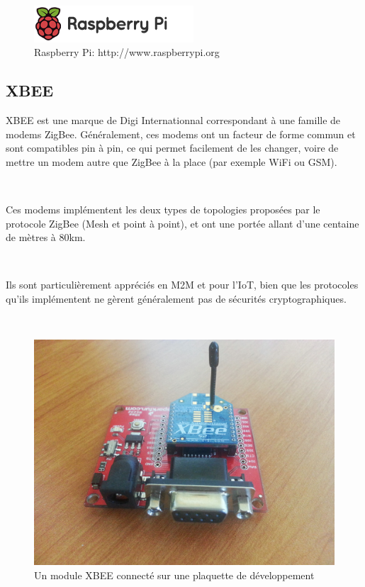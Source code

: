 \documentclass{article}
\begin{document}
~

\begin{figure}[h!]
    \centering\includegraphics[width=\linewidth*2/3]{img/sprite.png}
    \caption{Raspberry Pi: http://www.raspberrypi.org}
\end{figure}

\clearpage

\subsection{XBEE}
\label{xbee}

XBEE est une marque de Digi Internationnal correspondant à une famille de modems ZigBee. Généralement, ces modems ont un facteur de forme commun et sont compatibles pin à pin, ce qui permet facilement de les changer, voire de mettre un modem autre que ZigBee à la place (par exemple WiFi ou GSM).

~

Ces modems implémentent les deux types de topologies proposées par le protocole ZigBee (Mesh et point à point), et ont une portée allant d’une centaine de mètres à 80km.

~

Ils sont particulièrement appréciés en M2M et pour l’IoT, bien que les protocoles qu’ils implémentent ne gèrent généralement pas de sécurités cryptographiques.

~

\begin{figure}[h!]
    \centering\includegraphics[width=\linewidth*2/3]{img/xbee.jpg}
    \caption{Un module XBEE connecté sur une plaquette de développement}
\end{figure}
\end{document}
